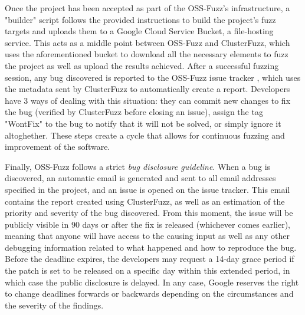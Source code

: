 \documentclass[Lau,oneside]{sapthesis}%
\begin{document}
Once the project has been accepted as part of the OSS-Fuzz's infrastructure, a "builder" script follows the provided instructions to build the project's fuzz targets and uploads them to a Google Cloud Service Bucket, a file-hosting service.
\newline
This acts as a middle point between OSS-Fuzz and ClusterFuzz, which uses the aforementioned bucket to download all the necessary elements to fuzz the project as well as upload the results achieved.
\newline \newline \newline
After a successful fuzzing session, any bug discovered is reported to the OSS-Fuzz issue tracker \cite{ref:ossfuzz_bugtracker}, which uses the metadata sent by ClusterFuzz to automatically create a report. 
\newline
Developers have 3 ways of dealing with this situation: they can commit new changes to fix the bug (verified by ClusterFuzz before closing an issue), assign the tag "WontFix" to the bug to notify that it will not be solved, or simply ignore it altoghether. 
\newline \newline
These steps create a cycle that allows for continuous fuzzing and improvement of the software.


\newpage
Finally, OSS-Fuzz follows a strict \textit{bug disclosure guideline}. \cite{ref:bug_disclosure}
\newline \newline
When a bug is discovered, an automatic email is generated and sent to all email addresses specified in the project, and an issue is opened on the issue tracker.
\newline
This email contains the report created using ClusterFuzz, as well as an estimation of the priority and severity of the bug discovered.
\newline \newline
From this moment, the issue will be publicly visible in 90 days or after the fix is released (whichever comes earlier), meaning that anyone will have access to the causing input as well as any other debugging information related to what happened and how to reproduce the bug.
\newline
Before the deadline expires, the developers may request a 14-day grace period if the patch is set to be released on a specific day within this extended period, in which case the public disclosure is delayed.
\newline \newline
In any case, Google reserves the right to change deadlines forwards or backwards depending on the circumstances and the severity of the findings.
\end{document}
